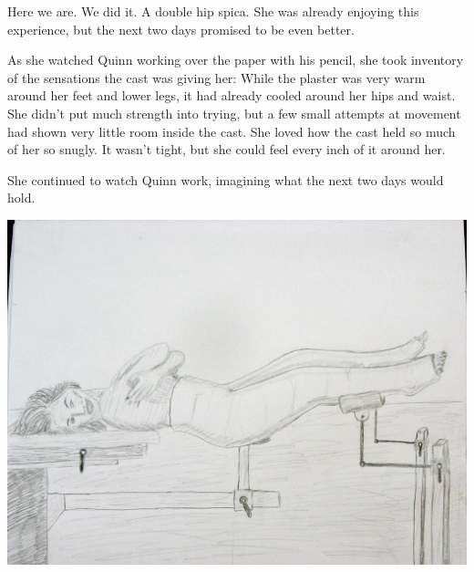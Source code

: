 \begin{thought}
Here we are. We did it. A double hip spica. She was already enjoying this experience, but
the next two days promised to be even better.

As she watched Quinn working over the paper with his pencil, she took inventory of the
sensations the cast was giving her: While the plaster was very warm around her feet and lower
legs, it had already cooled around her hips and waist. She didn't put much strength into trying,
but a few small attempts at movement had shown very little room inside the cast. She loved how
the cast held so much of her so snugly. It wasn't tight, but she could feel every inch of it
around her.

She continued to watch Quinn work, imagining what the next two days would hold.
\end{thought}

\newpage
\begin{center}
\includegraphics[width=\textwidth]{images/kicks40.jpg}
\end{center}
